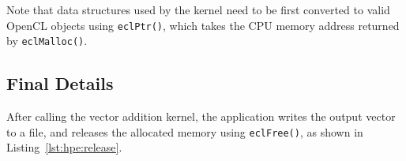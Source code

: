 Note that data structures used by the kernel need to be first converted to valid OpenCL objects 
using \texttt{eclPtr()}, which takes the CPU memory address returned by \texttt{eclMalloc()}.

\subsection{Final Details}
After calling the vector addition kernel, the application writes the output vector to a file, and 
releases the allocated memory using \texttt{eclFree()}, as shown in Listing~\ref{lst:hpe:release}.





